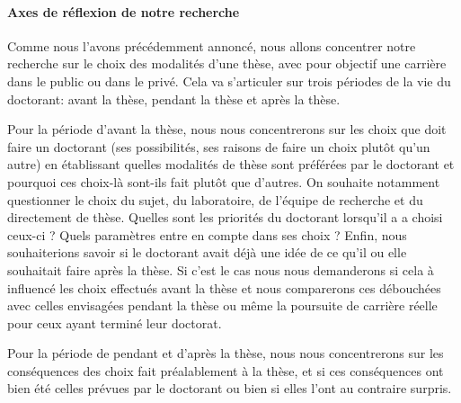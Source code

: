 \documentclass[12pt]{article}
\begin{document}


\paragraph{Axes de réflexion de notre recherche}

Comme nous l'avons précédemment annoncé, nous allons concentrer notre recherche sur le choix des modalités d'une thèse, avec pour objectif une carrière dans le public ou dans le privé. Cela va s'articuler sur trois périodes de la vie du doctorant: avant la thèse, pendant la thèse et après la thèse.

Pour la période d'avant la thèse, nous nous concentrerons sur les choix que doit faire un doctorant (ses possibilités, ses raisons de faire un choix plutôt qu'un autre) en établissant quelles modalités de thèse sont préférées par le doctorant et pourquoi ces choix-là sont-ils fait plutôt que d'autres.
On souhaite notamment questionner le choix du sujet, du laboratoire, de l'équipe de recherche et du directement de thèse. Quelles sont les priorités du doctorant lorsqu'il a a choisi ceux-ci ? Quels paramètres entre en compte dans ses choix ? 
Enfin, nous souhaiterions savoir si le doctorant avait déjà une idée de ce qu'il ou elle souhaitait faire après la thèse. Si c'est le cas nous nous demanderons si cela à influencé les choix effectués avant la thèse et nous comparerons ces débouchées avec celles envisagées pendant la thèse ou même la poursuite de carrière réelle pour ceux ayant terminé leur doctorat. 




Pour la période de pendant et d'après la thèse, nous nous concentrerons sur les conséquences des choix fait préalablement à la thèse, et si ces conséquences ont bien été celles prévues par le doctorant ou bien si elles l'ont au contraire surpris.



\end{document}
